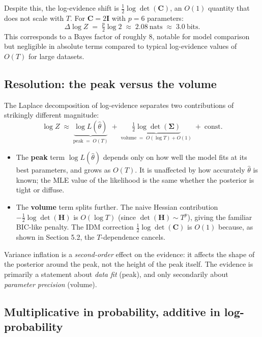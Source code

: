 \documentclass[11pt]{article}
\begin{document}
Despite this, the log-evidence shift is $\tfrac{1}{2}\log\det(\mathbf C)$, an $O(1)$ quantity that does not scale with $T$. For $\mathbf C = 2\mathbf I$ with $p = 6$ parameters:
\begin{equation}
\Delta \log Z
\;=\;
\tfrac{p}{2}\log 2
\;\approx\;
2.08\ \text{nats}
\;\approx\;
3.0\ \text{bits}.
\end{equation}
This corresponds to a Bayes factor of roughly $8$, notable for model comparison but negligible in absolute terms compared to typical log-evidence values of $O(T)$ for large datasets.

\subsection{Resolution: the peak versus the volume}

The Laplace decomposition of log-evidence separates two contributions of strikingly different magnitude:
\begin{equation}
\log Z
\;\approx\;
\underbrace{\log L(\hat\theta)}_{\text{peak} \;=\; O(T)}
\;+\;
\underbrace{\tfrac{1}{2}\log\det(\boldsymbol\Sigma)}_{\text{volume} \;=\; O(\log T) + O(1)}
\;+\;
\text{const}.
\end{equation}

\begin{itemize}
\item The \textbf{peak} term $\log L(\hat\theta)$ depends only on how well the model fits at its best parameters, and grows as $O(T)$. It is unaffected by how accurately $\hat\theta$ is known; the MLE value of the likelihood is the same whether the posterior is tight or diffuse.
\item The \textbf{volume} term splits further. The naive Hessian contribution $-\tfrac{1}{2}\log\det(\mathbf H)$ is $O(\log T)$ (since $\det(\mathbf H) \sim T^p$), giving the familiar BIC-like penalty. The IDM correction $\tfrac{1}{2}\log\det(\mathbf C)$ is $O(1)$ because, as shown in Section 5.2, the $T$-dependence cancels.
\end{itemize}

Variance inflation is a \emph{second-order} effect on the evidence: it affects the shape of the posterior around the peak, not the height of the peak itself. The evidence is primarily a statement about \emph{data fit} (peak), and only secondarily about \emph{parameter precision} (volume).

\subsection{Multiplicative in probability, additive in log-probability}
\end{document}
